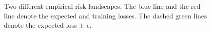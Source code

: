 \documentclass[11pt]{article}
\begin{document}
\begin{figure}[h]
	\centering
	\caption{Two different empirical risk landscapes. The blue line and the red line denote the expected and training losses. The dashed green lines denote the expected loss $\pm$ $\epsilon$.}
\end{figure}
\end{document}
